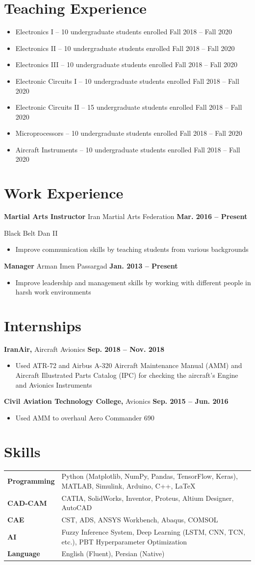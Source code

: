 \documentclass[a4,25pt]{article}
\newenvironment{Experience}[1]{
    \section*{#1} \vspace{-.2cm}
    \hspace{.5cm}
    \begin{minipage}{0.95\linewidth}
    }{ \end{minipage}}
\newcommand{\experience}[3]{ 
  \vspace{0.1cm}\textbf{#1}{ #2} \hfill \textbf{#3} \par
}
\newcommand{\expdetail}[1]{
        {#1 } \par
}
\newcommand{\expdetails}[1]{
    \begin{itemize} 
    \item #1 \vspace{1pt}
    \end{itemize} 
}
\newenvironment{Skills}[1]{
    \section*{#1} \vspace{-.2cm} \hspace{.5cm}
    \begin{tabular}{p{0.2\textwidth} p{0.8\textwidth}}
    }{\end{tabular}}
\newcommand{\skill}[2]{
    \textbf{#1} & {#2} \\
}
\begin{document}
\begin{Experience}{Teaching Experience}
\begin{minipage}{0.98\linewidth}
{\begin{minipage}{0.98\linewidth}
{    \expdetails{Electronics I – 10 undergraduate students enrolled \hfill Fall 2018 – Fall 2020}
    \expdetails{Electronics II – 10 undergraduate students enrolled \hfill Fall 2018 – Fall 2020}
    \expdetails{Electronics III – 10 undergraduate students enrolled \hfill Fall 2018 – Fall 2020}
    \expdetails{Electronic Circuits I – 10 undergraduate students enrolled \hfill Fall 2018 – Fall 2020}
    \expdetails{Electronic Circuits II – 15 undergraduate students enrolled \hfill Fall 2018 – Fall 2020}
    \expdetails{Microprocessors – 10 undergraduate students enrolled \hfill Fall 2018 – Fall 2020}
    \expdetails{Aircraft Instruments – 10 undergraduate students enrolled \hfill Fall 2018 – Fall 2020}}
    \end{minipage}
    }\end{minipage}
\end{Experience}

\begin{Experience}{Work Experience}
    \experience{Martial Arts Instructor}{Iran Martial Arts Federation}{Mar. 2016 – Present}
    \expdetail{Black Belt Dan II}
    \expdetails{Improve communication skills by teaching students from various backgrounds}
    \experience{Manager}{Arman Imen Passargad}{Jan. 2013 – Present}
    \expdetails{Improve leadership and management skills by working with different people in harsh work environments}
\end{Experience}

\begin{Experience}{Internships}
    \experience{IranAir,}{ Aircraft Avionics}{Sep. 2018 – Nov. 2018}
    \expdetails{Used ATR-72 and Airbus A-320 Aircraft Maintenance Manual (AMM) and Aircraft Illustrated Parts Catalog (IPC) for checking the aircraft’s Engine and Avionics Instruments}
    
    \experience{Civil Aviation Technology College,}{ Avionics}{Sep. 2015 – Jun. 2016}
    \expdetails{Used AMM to overhaul Aero Commander 690}
\end{Experience}


\begin{Skills}{Skills}
    \skill{Programming}{Python (Matplotlib, NumPy, Pandas, TensorFlow, Keras), MATLAB, Simulink, Arduino, C++, LaTeX}
    \skill{CAD-CAM}{CATIA, SolidWorks, Inventor, Proteus, Altium Designer, AutoCAD}
    \skill{CAE}{CST, ADS, ANSYS Workbench, Abaqus, COMSOL}
    \skill{AI}{Fuzzy Inference System, Deep Learning (LSTM, CNN, TCN, etc.), PBT Hyperparameter Optimization}
    \skill{Language}{English (Fluent), Persian (Native)}
\end{Skills}
\end{document}
